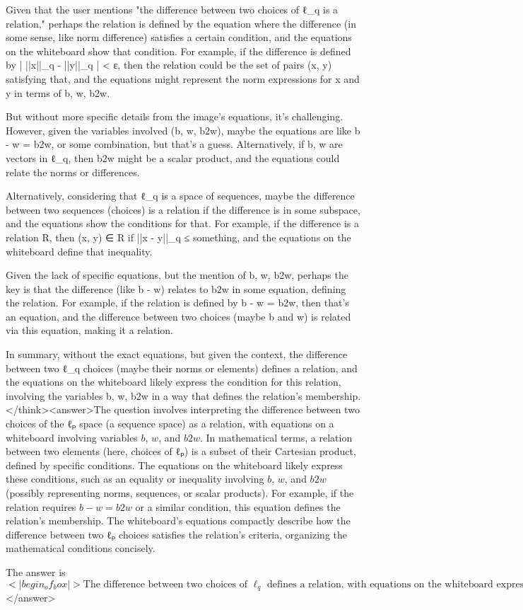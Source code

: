 Given that the user mentions "the difference between two choices of ℓ_q is a relation," perhaps the relation is defined by the equation where the difference (in some sense, like norm difference) satisfies a certain condition, and the equations on the whiteboard show that condition. For example, if the difference is defined by | ||x||_q - ||y||_q | < ε, then the relation could be the set of pairs (x, y) satisfying that, and the equations might represent the norm expressions for x and y in terms of b, w, b2w.

But without more specific details from the image's equations, it's challenging. However, given the variables involved (b, w, b2w), maybe the equations are like b - w = b2w, or some combination, but that's a guess. Alternatively, if b, w are vectors in ℓ_q, then b2w might be a scalar product, and the equations could relate the norms or differences.

Alternatively, considering that ℓ_q is a space of sequences, maybe the difference between two sequences (choices) is a relation if the difference is in some subspace, and the equations show the conditions for that. For example, if the difference is a relation R, then (x, y) ∈ R if ||x - y||_q ≤ something, and the equations on the whiteboard define that inequality.

Given the lack of specific equations, but the mention of b, w, b2w, perhaps the key is that the difference (like b - w) relates to b2w in some equation, defining the relation. For example, if the relation is defined by b - w = b2w, then that's an equation, and the difference between two choices (maybe b and w) is related via this equation, making it a relation.

In summary, without the exact equations, but given the context, the difference between two ℓ_q choices (maybe their norms or elements) defines a relation, and the equations on the whiteboard likely express the condition for this relation, involving the variables b, w, b2w in a way that defines the relation's membership.</think><answer>The question involves interpreting the difference between two choices of the ℓₚ space (a sequence space) as a relation, with equations on a whiteboard involving variables \( b \), \( w \), and \( b2w \). In mathematical terms, a relation between two elements (here, choices of ℓₚ) is a subset of their Cartesian product, defined by specific conditions. The equations on the whiteboard likely express these conditions, such as an equality or inequality involving \( b \), \( w \), and \( b2w \) (possibly representing norms, sequences, or scalar products). For example, if the relation requires \( b - w = b2w \) or a similar condition, this equation defines the relation’s membership. The whiteboard’s equations compactly describe how the difference between two ℓₚ choices satisfies the relation’s criteria, organizing the mathematical conditions concisely.  

The answer is \(<|begin_of_box|>\text{The difference between two choices of } \ell_q \text{ defines a relation, with equations on the whiteboard expressing the relation's conditions involving } b, w, b2w.<|end_of_box|>\)</answer>